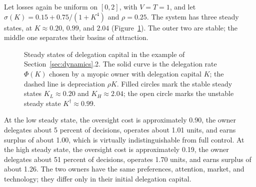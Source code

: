 \documentclass[11pt,a4paper]{article}
\theoremstyle{plain}
\begin{document}
Let losses again be uniform on $[0, 2]$, with $V = T = 1$, and let $\sigma(K) = 0.15 + 0.75 / (1 + K^4)$ and $\rho = 0.25$. The system has three steady states, at $K \approx 0.20$, $0.99$, and $2.04$ (Figure~\ref{fig:steady}). The outer two are stable; the middle one separates their basins of attraction.

\begin{figure}[ht]
\centering
{}
\caption{Steady states of delegation capital in the example of Section~\ref{sec:dynamics}.2. The solid curve is the delegation rate $\Phi(K)$ chosen by a myopic owner with delegation capital $K$; the dashed line is depreciation $\rho K$. Filled circles mark the stable steady states $K_L \approx 0.20$ and $K_H \approx 2.04$; the open circle marks the unstable steady state $K^\dagger \approx 0.99$.}\label{fig:steady}
\end{figure}

At the low steady state, the oversight cost is approximately 0.90, the owner delegates about 5 percent of decisions, operates about 1.01 units, and earns surplus of about 1.00, which is virtually indistinguishable from full control. At the high steady state, the oversight cost is approximately 0.19, the owner delegates about 51 percent of decisions, operates 1.70 units, and earns surplus of about 1.26. The two owners have the same preferences, attention, market, and technology; they differ only in their initial delegation capital.
\end{document}
